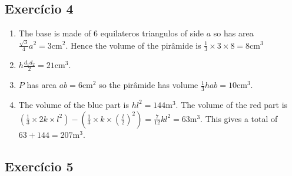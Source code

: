 \subsection*{Exercício 4}
\begin{enumerate}
\item The base is made of $6$ equilateros triangulos of side $a$ so
  has area $\frac{\sqrt{3}}{4}a^2 = 3 \text{cm}^2$. Hence the
  volume of the pirâmide is $\frac{1}{3} \times 3 \times 8 = 8\text{cm}^3$
\item $h \frac{d_1 d_2}{2} = 21 \text{cm}^3$.
\item $P$ has area $ab=6\text{cm}^2$ so the pirâmide has
  volume $\frac{1}{3} h ab = 10\text{cm}^3$.
\item The volume of the blue part is $hl^2 = 144\text{m}^3$.
  The volume of the red part is
  $\left(\frac{1}{3} \times 2k \times l^2\right) -
  \left(\frac{1}{3} \times k \times \left(\frac{l}{2}\right)^2\right) =
  \frac{7}{12} k l^2 = 63 \text{m}^3$. This gives a total
  of $63+144=207\text{m}^3$.

\end{enumerate}

\subsection*{Exercício 5}

